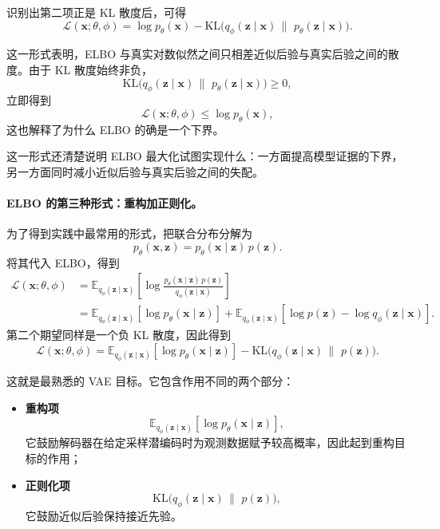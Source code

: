 识别出第二项正是 KL 散度后，可得
\[
\boxed{
\mathcal{L}(\mathbf{x};\theta,\phi)
=
\log p_{\theta}(\mathbf{x})
-
\mathrm{KL}\!\bigl(
q_{\phi}(\mathbf{z}\mid\mathbf{x})
\,\|\,\,
p_{\theta}(\mathbf{z}\mid\mathbf{x})
\bigr).
}
\]

这一形式表明，ELBO 与真实对数似然之间只相差近似后验与真实后验之间的散度。由于 KL 散度始终非负，
\[
\mathrm{KL}\!\bigl(
q_{\phi}(\mathbf{z}\mid\mathbf{x})
\,\|\,\,
p_{\theta}(\mathbf{z}\mid\mathbf{x})
\bigr)\ge0,
\]
立即得到
\[
\mathcal{L}(\mathbf{x};\theta,\phi)\le\log p_{\theta}(\mathbf{x}),
\]
这也解释了为什么 ELBO 的确是一个下界。

这一形式还清楚说明 ELBO 最大化试图实现什么：一方面提高模型证据的下界，另一方面同时减小近似后验与真实后验之间的失配。

\paragraph{ELBO 的第三种形式：重构加正则化。}

为了得到实践中最常用的形式，把联合分布分解为
\[
p_{\theta}(\mathbf{x},\mathbf{z})
=
p_{\theta}(\mathbf{x}\mid\mathbf{z})\,p(\mathbf{z}).
\]
将其代入 ELBO，得到
\[
\begin{aligned}
\mathcal{L}(\mathbf{x};\theta,\phi)
&=
\mathbb{E}_{q_{\phi}(\mathbf{z}\mid\mathbf{x})}
\!\left[
\log\frac{p_{\theta}(\mathbf{x}\mid\mathbf{z})\,p(\mathbf{z})}
{q_{\phi}(\mathbf{z}\mid\mathbf{x})}
\right] \\[4pt]
&=
\mathbb{E}_{q_{\phi}(\mathbf{z}\mid\mathbf{x})}
\!\left[\log p_{\theta}(\mathbf{x}\mid\mathbf{z})\right]
+
\mathbb{E}_{q_{\phi}(\mathbf{z}\mid\mathbf{x})}
\!\left[
\log p(\mathbf{z})-\log q_{\phi}(\mathbf{z}\mid\mathbf{x})
\right].
\end{aligned}
\]
第二个期望同样是一个负 KL 散度，因此得到
\[
\boxed{
\mathcal{L}(\mathbf{x};\theta,\phi)
=
\mathbb{E}_{q_{\phi}(\mathbf{z}\mid\mathbf{x})}
\!\left[\log p_{\theta}(\mathbf{x}\mid\mathbf{z})\right]
-
\mathrm{KL}\!\bigl(
q_{\phi}(\mathbf{z}\mid\mathbf{x})
\,\|\,\,
p(\mathbf{z})
\bigr).
}
\]

这就是最熟悉的 VAE 目标。它包含作用不同的两个部分：
\begin{itemize}
    \item \textbf{重构项}
    \[
    \mathbb{E}_{q_{\phi}(\mathbf{z}\mid\mathbf{x})}
    [\log p_{\theta}(\mathbf{x}\mid \mathbf{z})],
    \]
    它鼓励解码器在给定采样潜编码时为观测数据赋予较高概率，因此起到重构目标的作用；

    \item \textbf{正则化项}
    \[
    \mathrm{KL}\!\bigl(
    q_{\phi}(\mathbf{z}\mid \mathbf{x})
    \,\|\,\,
    p(\mathbf{z})
    \bigr),
    \]
    它鼓励近似后验保持接近先验。
\end{itemize}

